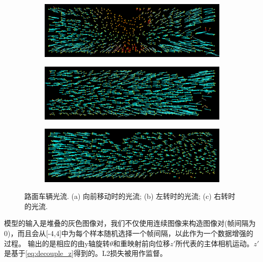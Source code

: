 \begin{figure}[ht]
    \centering
    \begin{subfigure}[b]{0.45\textwidth}
        \includegraphics[width=\textwidth]{datavo/flow_61.png}
        \caption{}
        \label{fig:optical_flow_f} 
    \end{subfigure}
    \begin{subfigure}[b]{0.45\textwidth}
        \includegraphics[width=\textwidth]{datavo/flow_196.png}
        \caption{}
        \label{fig:optical_flow_l} 
    \end{subfigure}
    \begin{subfigure}[b]{0.45\textwidth}
        \includegraphics[width=\textwidth]{datavo/flow_96.png}
        \caption{}
        \label{fig:optical_flow_r} 
    \end{subfigure}
    \caption{路面车辆光流. (a) 向前移动时的光流; (b) 左转时的光流; (c) 右转时的光流.}
    \label{fig:optical_flow}
\end{figure}

模型的输入是堆叠的灰色图像对，我们不仅使用连续图像来构造图像对{(帧间隔为0)}，而且会从{[-4,4]}中为每个样本随机选择一个{帧间隔}，以此作为一个数据{增强}的过程。
输出的是相应的由y轴旋转$\theta$和{重映射}前向位移$z'$所代表的主体相机运动。$z'$是基于\eqref{eq:decouple_z}得到的。L2损失被用作监督。

